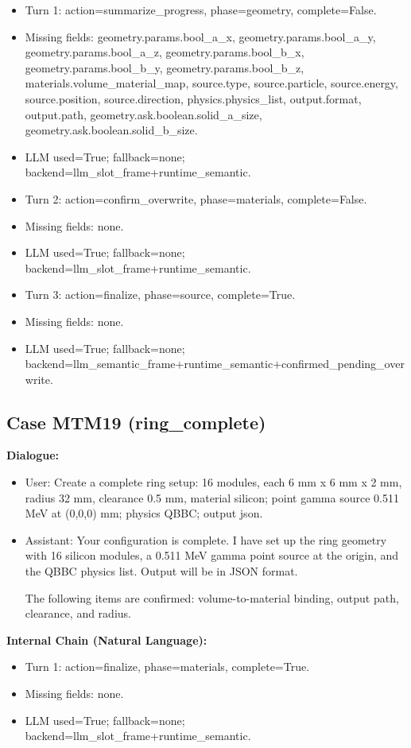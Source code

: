 \documentclass[11pt]{ctexart}
\begin{document}
\begin{itemize}
\item Turn 1: action=summarize\_progress, phase=geometry, complete=False.
\item Missing fields: geometry.params.bool\_a\_x, geometry.params.bool\_a\_y, geometry.params.bool\_a\_z, geometry.params.bool\_b\_x, geometry.params.bool\_b\_y, geometry.params.bool\_b\_z, materials.volume\_material\_map, source.type, source.particle, source.energy, source.position, source.direction, physics.physics\_list, output.format, output.path, geometry.ask.boolean.solid\_a\_size, geometry.ask.boolean.solid\_b\_size.
\item LLM used=True; fallback=none; backend=llm\_slot\_frame+runtime\_semantic.
\item Turn 2: action=confirm\_overwrite, phase=materials, complete=False.
\item Missing fields: none.
\item LLM used=True; fallback=none; backend=llm\_slot\_frame+runtime\_semantic.
\item Turn 3: action=finalize, phase=source, complete=True.
\item Missing fields: none.
\item LLM used=True; fallback=none; backend=llm\_semantic\_frame+runtime\_semantic+confirmed\_pending\_overwrite.
\end{itemize}
\subsection{Case MTM19 (ring\_complete)}
\textbf{Dialogue:}
\begin{itemize}
\item User: Create a complete ring setup: 16 modules, each 6 mm x 6 mm x 2 mm, radius 32 mm, clearance 0.5 mm, material silicon; point gamma source 0.511 MeV at (0,0,0) mm; physics QBBC; output json.
\item Assistant: Your configuration is complete. I have set up the ring geometry with 16 silicon modules, a 0.511 MeV gamma point source at the origin, and the QBBC physics list. Output will be in JSON format.

The following items are confirmed: volume-to-material binding, output path, clearance, and radius.
\end{itemize}
\textbf{Internal Chain (Natural Language):}
\begin{itemize}
\item Turn 1: action=finalize, phase=materials, complete=True.
\item Missing fields: none.
\item LLM used=True; fallback=none; backend=llm\_slot\_frame+runtime\_semantic.
\end{itemize}
\end{document}
